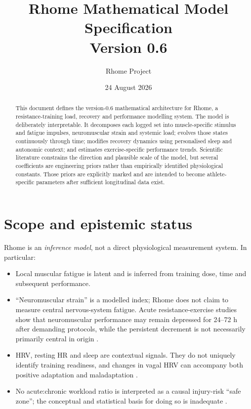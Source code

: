 \documentclass[11pt]{article}
\title{Rhome Mathematical Model Specification\\\large Version 0.6}
\author{Rhome Project}
\date{24 August 2026}
\begin{document}
\maketitle

\begin{abstract}
This document defines the version-0.6 mathematical architecture for Rhome, a resistance-training load, recovery and performance modelling system. The model is deliberately interpretable. It decomposes each logged set into muscle-specific stimulus and fatigue impulses, neuromuscular strain and systemic load; evolves those states continuously through time; modifies recovery dynamics using personalised sleep and autonomic context; and estimates exercise-specific performance trends. Scientific literature constrains the direction and plausible scale of the model, but several coefficients are engineering priors rather than empirically identified physiological constants. Those priors are explicitly marked and are intended to become athlete-specific parameters after sufficient longitudinal data exist.
\end{abstract}

\section{Scope and epistemic status}

Rhome is an \emph{inference model}, not a direct physiological measurement system. In particular:

\begin{itemize}
    \item Local muscular fatigue is latent and is inferred from training dose, time and subsequent performance.
    \item ``Neuromuscular strain'' is a modelled index; Rhome does not claim to measure central nervous-system fatigue. Acute resistance-exercise studies show that neuromuscular performance may remain depressed for 24--72 h after demanding protocols, while the persistent decrement is not necessarily primarily central in origin \cite{moran2017,thomas2018}.
    \item HRV, resting HR and sleep are contextual signals. They do not uniquely identify training readiness, and changes in vagal HRV can accompany both positive adaptation and maladaptation \cite{bellenger2016}.
    \item No acute:chronic workload ratio is interpreted as a causal injury-risk ``safe zone''; the conceptual and statistical basis for doing so is inadequate \cite{impellizzeri2020}.
\end{itemize}
\end{document}
